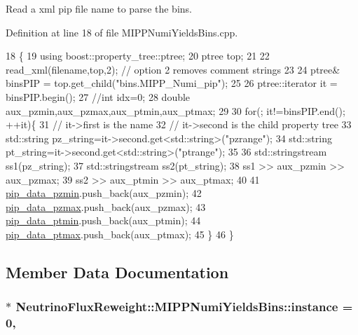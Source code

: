 Read a xml pip file name to parse the bins. 



Definition at line 18 of file M\-I\-P\-P\-Numi\-Yields\-Bins.\-cpp.


\begin{DoxyCode}
18                                                                 \{
19     \textcolor{keyword}{using} boost::property\_tree::ptree;
20     ptree top;
21     
22     read\_xml(filename,top,2); \textcolor{comment}{// option 2 removes comment strings}
23     
24     ptree& binsPIP = top.get\_child(\textcolor{stringliteral}{"bins.MIPP\_Numi\_pip"});
25      
26     ptree::iterator it = binsPIP.begin();
27     \textcolor{comment}{//int idx=0;}
28     \textcolor{keywordtype}{double} aux\_pzmin,aux\_pzmax,aux\_ptmin,aux\_ptmax;
29 
30     \textcolor{keywordflow}{for}(; it!=binsPIP.end(); ++it)\{
31       \textcolor{comment}{// it->first is the name}
32       \textcolor{comment}{// it->second is the child property tree}
33       std::string pz\_string=it->second.get<std::string>(\textcolor{stringliteral}{"pzrange"});
34       std::string pt\_string=it->second.get<std::string>(\textcolor{stringliteral}{"ptrange"});
35       
36       std::stringstream ss1(pz\_string);
37       std::stringstream ss2(pt\_string);
38       ss1 >> aux\_pzmin >> aux\_pzmax;
39       ss2 >> aux\_ptmin >> aux\_ptmax;
40    
41       \hyperlink{class_neutrino_flux_reweight_1_1_m_i_p_p_numi_yields_bins_aa9625cf6520d1906b084fc7051e28e64}{pip\_data\_pzmin}.push\_back(aux\_pzmin);
42       \hyperlink{class_neutrino_flux_reweight_1_1_m_i_p_p_numi_yields_bins_a245698dccfcff92bc4d1bf3458e2d809}{pip\_data\_pzmax}.push\_back(aux\_pzmax);
43       \hyperlink{class_neutrino_flux_reweight_1_1_m_i_p_p_numi_yields_bins_aec5bdb4bcc7c894e34db336163e0bc13}{pip\_data\_ptmin}.push\_back(aux\_ptmin);
44       \hyperlink{class_neutrino_flux_reweight_1_1_m_i_p_p_numi_yields_bins_a00b588132209a2d82ffef318273d451a}{pip\_data\_ptmax}.push\_back(aux\_ptmax);
45     \}
46   \}
\end{DoxyCode}


\subsection{Member Data Documentation}
\hypertarget{class_neutrino_flux_reweight_1_1_m_i_p_p_numi_yields_bins_a8a1080c839321c71204457f99e9c91e0}{
\subsubsection[{instance}]{ $\ast$ Neutrino\-Flux\-Reweight\-::\-M\-I\-P\-P\-Numi\-Yields\-Bins\-::instance = 0\hspace{0.3cm}{\ttfamily [static]}, {\ttfamily [private]}}}\label{class_neutrino_flux_reweight_1_1_m_i_p_p_numi_yields_bins_a8a1080c839321c71204457f99e9c91e0}


